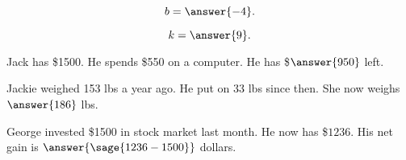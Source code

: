 \documentclass{ximera}
\begin{document}
\begin{shuffle}[3]
\begin{problem}
$$b=\answer{-4}.$$
\end{problem}

\begin{problem}

\begin{image}
\end{image}

$$k=\answer{9}.$$
\end{problem}

\begin{problem}
Jack has \$1500. He spends \$550 on a computer. He has \$$\answer{950}$ left.
\end{problem}


\begin{problem}
Jackie weighed 153 lbs a year ago. He put on 33 lbs since then. She now weighs $\answer{186}$ lbs.
\end{problem}


\begin{problem}
George invested \$1500 in stock market last month. He now has \$$1236$. His net gain is $\answer{\sage{1236-1500}}$ dollars.
\end{problem}

\end{shuffle}
\end{document}
